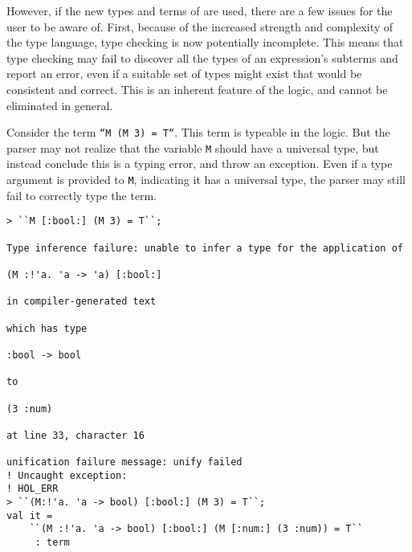 However, if the new types and terms of \HOLW{} are used, there are
a few issues for the user to be aware of.  First, because of the
increased strength and complexity of the type language, type checking
is now potentially incomplete.  This means that type checking may fail
to discover all the types of an expression's subterms and report an error,
even if a suitable set of types might exist that would be consistent and
correct.  This is an inherent feature of the logic, and cannot be eliminated
in general.

Consider the term \texttt{``M (M 3) = T``}. This term is typeable in the logic.
But
the parser may
not realize that the variable \texttt{M} should have a universal type,
but instead conclude this is a typing error, and throw an exception.
%
Even if a type argument is provided to \texttt{M}, indicating
it has a
universal type, the parser may still fail to correctly type the term.
%
%
%
%
%
%
%
%
%
%
%
%
%
\begin{session}
\begin{verbatim}
> ``M [:bool:] (M 3) = T``;

Type inference failure: unable to infer a type for the application of

(M :!'a. 'a -> 'a) [:bool:]

in compiler-generated text

which has type

:bool -> bool

to

(3 :num)

at line 33, character 16

unification failure message: unify failed
! Uncaught exception: 
! HOL_ERR
> ``(M:!'a. 'a -> bool) [:bool:] (M 3) = T``;
val it =
    ``(M :!'a. 'a -> bool) [:bool:] (M [:num:] (3 :num)) = T``
     : term
\end{verbatim}
\end{session}

